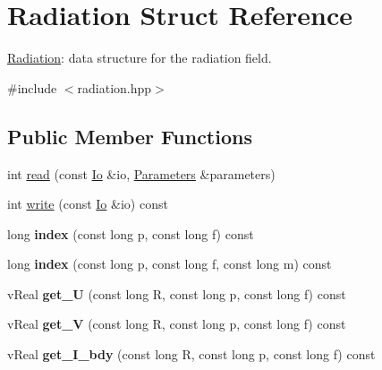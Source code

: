 \hypertarget{structRadiation}{}\section{Radiation Struct Reference}
\label{structRadiation}


\mbox{\hyperlink{structRadiation}{Radiation}}\+: data structure for the radiation field.  




{\ttfamily \#include $<$radiation.\+hpp$>$}

\subsection*{Public Member Functions}
\begin{DoxyCompactItemize}
\item 
int \mbox{\hyperlink{structRadiation_ae1c20ca666229715888324bdfc7e7b32}{read}} (const \mbox{\hyperlink{structIo}{Io}} \&io, \mbox{\hyperlink{classParameters}{Parameters}} \&parameters)
\item 
int \mbox{\hyperlink{structRadiation_adb8acb48bb764b2dce1b4060f8ded541}{write}} (const \mbox{\hyperlink{structIo}{Io}} \&io) const
\item 
\mbox{\label{structRadiation_a9d0c9c1b51c28bf6a3eda363a0b84327}} 
long {\bfseries index} (const long p, const long f) const
\item 
\mbox{\label{structRadiation_af7a62862349300f6983e65ea6286844f}} 
long {\bfseries index} (const long p, const long f, const long m) const
\item 
\mbox{\label{structRadiation_a9712eac769f8adb4c8bc39ef1d3b7dcd}} 
v\+Real {\bfseries get\+\_\+U} (const long R, const long p, const long f) const
\item 
\mbox{\label{structRadiation_ad12ee819315cf5400895c12d84ca8fe2}} 
v\+Real {\bfseries get\+\_\+V} (const long R, const long p, const long f) const
\item 
\mbox{\label{structRadiation_af35d4cf35915a0d8ad02f0cbb1c89c63}} 
v\+Real {\bfseries get\+\_\+\+I\+\_\+bdy} (const long R, const long p, const long f) const
\item 
\mbox{\label{structRadiation_aa006c2c220fb0f9613ca9b7697dd2474}} 

\end{DoxyCompactItemize}
